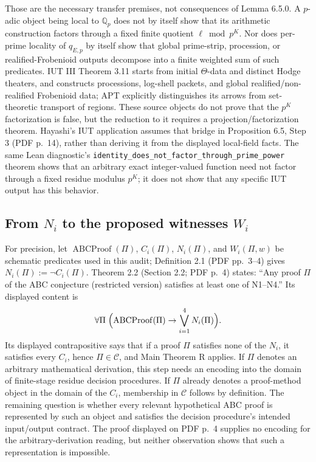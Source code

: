\documentclass[11pt]{article}
\begin{document}
Those are the necessary transfer premises, not consequences of Lemma 6.5.0. A $p$-adic object being local to $\mathbb Q_p$ does not by itself show that its arithmetic construction factors through a fixed finite quotient $\ell\bmod p^K$. Nor does per-prime locality of $q_{E,p}$ by itself show that global prime-strip, procession, or realified-Frobenioid outputs decompose into a finite weighted sum of such predicates. IUT III Theorem 3.11 \cite{MochizukiIUTIII} starts from initial $\Theta$-data and distinct Hodge theaters, and constructs processions, log-shell packets, and global realified/non-realified Frobenioid data; APT explicitly distinguishes its arrows from set-theoretic transport of regions. These source objects do not prove that the $p^K$ factorization is false, but the reduction to it requires a projection/factorization theorem. Hayashi's IUT application assumes that bridge in Proposition 6.5, Step 3 (PDF p.~14), rather than deriving it from the displayed local-field facts. The same Lean diagnostic's \texttt{identity\_does\_not\_factor\_through\_prime\_power} theorem shows that an arbitrary exact integer-valued function need not factor through a fixed residue modulus $p^K$; it does not show that any specific IUT output has this behavior.

\subsection{From $N_i$ to the proposed witnesses $W_i$}
For precision, let $\operatorname{ABCProof}(\Pi)$, $C_i(\Pi)$, $N_i(\Pi)$, and $W_i(\Pi,w)$ be schematic predicates used in this audit; Definition 2.1 (PDF pp.~3--4) gives $N_i(\Pi):=\neg C_i(\Pi)$. Theorem 2.2 (Section 2.2; PDF p.~4) states: ``Any proof $\Pi$ of the ABC conjecture (restricted version) satisfies at least one of N1--N4.'' Its displayed content is
\[
\forall\Pi\;\Bigl(\operatorname{ABCProof}(\Pi)\to\bigvee_{i=1}^4N_i(\Pi)\Bigr).
\]
Its displayed contrapositive says that if a proof $\Pi$ satisfies none of the $N_i$, it satisfies every $C_i$, hence $\Pi\in\mathcal C$, and Main Theorem R applies. If $\Pi$ denotes an arbitrary mathematical derivation, this step needs an encoding into the domain of finite-stage residue decision procedures. If $\Pi$ already denotes a proof-method object in the domain of the $C_i$, membership in $\mathcal C$ follows by definition. The remaining question is whether every relevant hypothetical ABC proof is represented by such an object and satisfies the decision procedure's intended input/output contract. The proof displayed on PDF p.~4 supplies no encoding for the arbitrary-derivation reading, but neither observation shows that such a representation is impossible.
\end{document}
